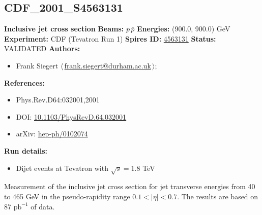 \subsection[CDF\_2001\_S4563131]{CDF\_2001\_S4563131\,\cite{Affolder:2001fa}}
\textbf{Inclusive jet cross section}\newline
\textbf{Beams:} $p$\,$\bar{p}$ \newline
\textbf{Energies:} (900.0, 900.0) GeV \newline
\textbf{Experiment:} CDF (Tevatron Run 1) \newline
\textbf{Spires ID:} \href{http://www.slac.stanford.edu/spires/find/hep/www?rawcmd=key+4563131}{4563131}\newline
\textbf{Status:} VALIDATED\newline
\textbf{Authors:}
\begin{itemize}
  \item Frank Siegert $\langle\,$\href{mailto:frank.siegert@durham.ac.uk}{frank.siegert@durham.ac.uk}$\,\rangle$;
\end{itemize}
\textbf{References:}
\begin{itemize}
  \item Phys.Rev.D64:032001,2001
  \item DOI: \href{http://dx.doi.org/10.1103/PhysRevD.64.032001}{10.1103/PhysRevD.64.032001}
  \item arXiv: \href{http://arxiv.org/abs/hep-ph/0102074}{hep-ph/0102074}
\end{itemize}
\textbf{Run details:}
\begin{itemize}

  \item Dijet events at Tevatron with $\sqrt{s}=1.8$ TeV\end{itemize}

\noindent Measurement of the inclusive jet cross section for jet transverse energies from 40 to 465 GeV in the pseudo-rapidity range $0.1<|\eta|<0.7$. The results are based on 87 $\mathrm{pb}^{-1}$ of data.

\clearpage


\clearpage

